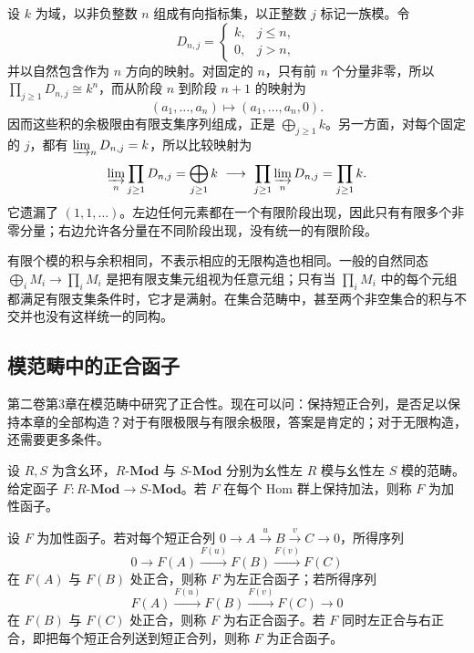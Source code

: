 \begin{example}[无限积使比较映射失去满射性]\label{b4:exm:filtered-infinite-product}
	设 \(k\) 为域，以非负整数 \(n\) 组成有向指标集，以正整数 \(j\) 标记一族模。令
	\[
		D_{n,j}=
		\begin{cases}
			k,&j\le n,\\
			0,&j>n,
		\end{cases}
	\]
	并以自然包含作为 \(n\) 方向的映射。对固定的 \(n\)，只有前 \(n\) 个分量非零，所以 \(\prod_{j\ge1}D_{n,j}\cong k^n\)，而从阶段 \(n\) 到阶段 \(n+1\) 的映射为
	\[
		(a_1,\ldots,a_n)\longmapsto(a_1,\ldots,a_n,0).
	\]
	因而这些积的余极限由有限支集序列组成，正是 \(\bigoplus_{j\ge1}k\)。另一方面，对每个固定的 \(j\)，都有 \(\varinjlim_nD_{n,j}=k\)，所以比较映射为
	\[
		\varinjlim_n\prod_{j\ge1}D_{n,j} =\bigoplus_{j\ge1}k \ \longrightarrow\
		\prod_{j\ge1}\varinjlim_nD_{n,j} =\prod_{j\ge1}k.
	\]
	它遗漏了 \((1,1,\ldots)\)。左边任何元素都在一个有限阶段出现，因此只有有限多个非零分量；右边允许各分量在不同阶段出现，没有统一的有限阶段。
\end{example}

有限个模的积与余积相同，不表示相应的无限构造也相同。一般的自然同态 \(\bigoplus_iM_i\rightarrow\prod_iM_i\) 是把有限支集元组视为任意元组；只有当 \(\prod_iM_i\) 中的每个元组都满足有限支集条件时，它才是满射。在集合范畴中，甚至两个非空集合的积与不交并也没有这样统一的同构。

\subsection{模范畴中的正合函子}
\label{b4:subsec:0204:03}

第二卷第3章在模范畴中研究了正合性。现在可以问：保持短正合列，是否足以保持本章的全部构造？对于有限极限与有限余极限，答案是肯定的；对于无限构造，还需要更多条件。

\begin{definition}[模范畴之间的正合函子]\label{b4:def:exact-module-functor}
	设 \(R,S\) 为含幺环，\(R\text{-}\mathbf{Mod}\) 与 \(S\text{-}\mathbf{Mod}\) 分别为幺性左 \(R\) 模与幺性左 \(S\) 模的范畴。给定函子 \(F:R\text{-}\mathbf{Mod}\rightarrow S\text{-}\mathbf{Mod}\)。若 \(F\) 在每个 Hom 群上保持加法，则称 \(F\) 为加性函子。

	设 \(F\) 为加性函子。若对每个短正合列 \(0\rightarrow A\xrightarrow{u}B\xrightarrow{v}C\rightarrow0\)，所得序列
	\[
		0\longrightarrow F(A)\xrightarrow{F(u)}F(B) \xrightarrow{F(v)}F(C)
	\]
	在 \(F(A)\) 与 \(F(B)\) 处正合，则称 \(F\) 为左正合函子；若所得序列
	\[
		F(A)\xrightarrow{F(u)}F(B)\xrightarrow{F(v)}F(C) \longrightarrow0
	\]
	在 \(F(B)\) 与 \(F(C)\) 处正合，则称 \(F\) 为右正合函子。若 \(F\) 同时左正合与右正合，即把每个短正合列送到短正合列，则称 \(F\) 为正合函子。
\end{definition}

